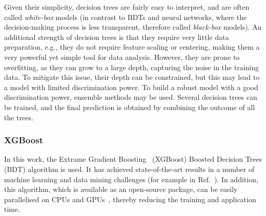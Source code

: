 Given their simplicity, decision trees are fairly easy to interpret, and are often called \emph{white-box} models (in contrast to BDTs and neural networks, where the decision-making process is less transparent, therefore called \emph{black-box} models). An additional strength of decision trees is that they require
very little data preparation, e.g., they do not require feature scaling or centering, making them a very powerful yet simple tool for data analysis. However, they are prone to overfitting, as they can grow to a large depth, capturing the noise in the training data. To mitigate this issue, their depth can be constrained, but this may lead to a model with limited discrimination power. To build a robust model with a good discrimination power, ensemble methods may be used. Several decision trees can be trained, and the final prediction is obtained by combining the outcome of all the trees. 

\subsubsection{XGBoost}
In this work, the Extrame Gradient Boosting~\cite{DBLP:xgboost} (XGBoost) Boosted Decision Trees (BDT) algorithm is used. It has achieved state-of-the-art results in a number of machine learning and data mining challenges (for example in Ref.~\cite{kaggle:higgs}). In addition, this algorithm, which is available as an open-source package, can be easily parallelised on CPUs and GPUs~\cite{mitchell2017accelerating}, thereby reducing the training and application time.

